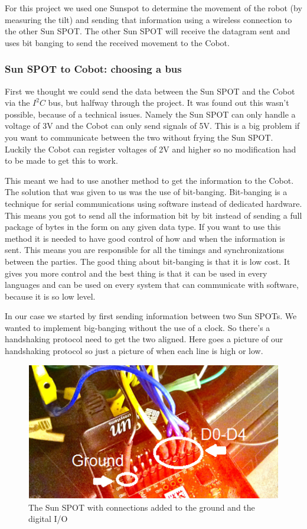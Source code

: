 \documentclass[a4paper,10pt]{article} %
\begin{document}
For this project we used one Sunspot to determine the movement of the robot (by
measuring the tilt) and sending that information using a wireless connection to
the other Sun SPOT. The other Sun SPOT will receive the datagram sent and uses
bit banging to send the received movement to the Cobot.

\subsubsection{Sun SPOT to Cobot: choosing a bus} %
\label{ssub:bitbang}

First we thought we could send the data between the Sun SPOT and the Cobot via
the $I^2C$ bus, but halfway through the project. It was found out this wasn't
possible, because of a technical issues. Namely the Sun SPOT can only handle a
voltage of 3V and the Cobot can only send signals of 5V. This is a big problem
if you want to communicate between the two without frying the Sun SPOT. Luckily
the Cobot can register voltages of 2V and higher so no modification had to be
made to get this to work.

This meant we had to use another method to get the information to the Cobot. The
solution that was given to us was the use of bit-banging. Bit-banging is a
technique for serial communications using software instead of dedicated
hardware. This means you got to send all the information bit by bit instead of
sending a full package of bytes in the form on any given data type. If you want
to use this method it is needed to have good control of how and when the
information is sent. This means you are responsible for all the timings and
synchronizations between the parties. The good thing about bit-banging is that
it is low cost. It gives you more control and the best thing is that it can be
used in every languages and can be used on every system that can communicate
with software, because it is so low level.

In our case we started by first sending information between two Sun SPOTs. We
wanted to implement big-banging without the use of a clock. So there's a
handshaking protocol need to get the two aligned. Here goes a picture of our
handshaking protocol so just a picture of when each line is high or low.
\begin{figure}
\label{fig:sunspotconnections}
\centering
\includegraphics{img/sunspotconnections1.png}
\caption{The Sun SPOT with connections added to the ground and the digital
I/O}
\end{figure}
\end{document}
